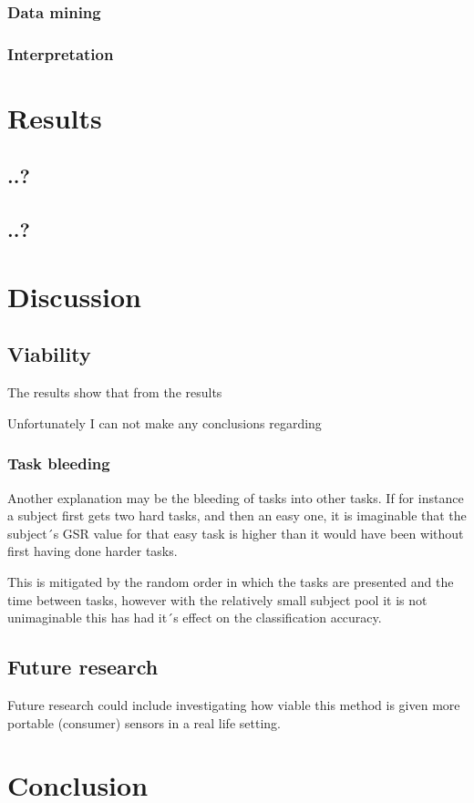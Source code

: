 \documentclass[12pt,fleqn,leqno,letterpaper]{article}
\begin{document}





\subsubsection{Data mining}
\subsubsection{Interpretation}

\section{Results}

\subsection{..?}
\subsection{..?}

\section{Discussion}
\subsection{Viability}
The results show that from the results 

Unfortunately I can not make any conclusions regarding 

\subsubsection{Task bleeding}
Another explanation may be the bleeding of tasks into other tasks. If for instance a subject first gets two hard tasks, and then an easy one, it is imaginable that the subject´s GSR value for that easy task is higher than it would have been without first having done harder tasks. 

This is mitigated by the random order in which the tasks are presented and the time between tasks, however with the relatively small subject pool it is not unimaginable this has had it´s effect on the classification accuracy.




\subsection{Future research}
Future research could include investigating how viable this method is given more portable (consumer) sensors in a real life setting. 

\section{Conclusion}






\end{document}
